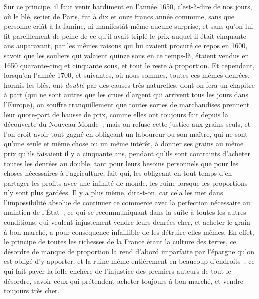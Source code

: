 \documentclass[french,twoside]{book} %
\begin{document}
Sur ce principe, il faut venir hardiment en l’année 1650, c’est-à-dire de nos jours, où le blé, setier de Paris, fut à dix et onze francs année commune, sans que personne criât à la famine, ni manifestât même aucune surprise, et sans qu’on lui fit pareillement de peine de ce qu’il avait triplé le prix auquel il était cinquante ans auparavant, par les mêmes raisons qui lui avaient procuré ce repos en 1600, savoir que les souliers qui valaient quinze sous en ce temps-là, étaient vendus en 1650 quarante-cinq et cinquante sous, et tout le reste à proportion. Et cependant, lorsqu’en l’année 1700, et suivantes, où nous sommes, toutes ces mêmes denrées, hormis les blés, ont {\itshape doublé} par des causes très naturelles, dont on fera un chapitre à part (qui ne sont autres que les crues d’argent qui arrivent tous les jours dans l’Europe), on souffre tranquillement que toutes sortes de marchandises prennent leur quote-part de hausse de prix, comme elles ont toujours fait depuis la découverte du Nouveau-Monde ; mais on refuse cette justice aux grains seuls, et l’on croit avoir tout gagné en obligeant un laboureur ou son maître, qui ne sont qu’une seule et même chose ou un même intérêt, à donner ses grains au même prix qu’ils faisaient il y a cinquante ans, pendant qu’ils sont contraints d’acheter toutes les denrées au double, tant pour leurs besoins personnels que pour les choses nécessaires à l’agriculture, fait qui, les obligeant en tout temps d’en partager les profits avec une infinité de monde, les ruine lorsque les proportions n’y sont plus gardées. Il y a plus même, dira-t-on, car cela les met dans l’impossibilité absolue de continuer ce commerce avec la perfection nécessaire au maintien de l’État ; ce qui se recommuniquant dans la suite à toutes les autres conditions, qui veulent injustement vendre leurs denrées cher, et acheter le grain à bon marché, a pour conséquence infaillible de les détruire elles-mêmes. En effet, le principe de toutes les richesses de la France étant la culture des terres, ce désordre de manque de proportion la rend d’abord imparfaite par l’épargne qu’on est obligé d’y apporter, et la ruine même entièrement en beaucoup d’endroits ; ce qui fait payer la folle enchère de l’injustice des premiers auteurs de tout le désordre, savoir ceux qui prétendent acheter toujours à bon marché, et vendre toujours très cher.
\end{document}
